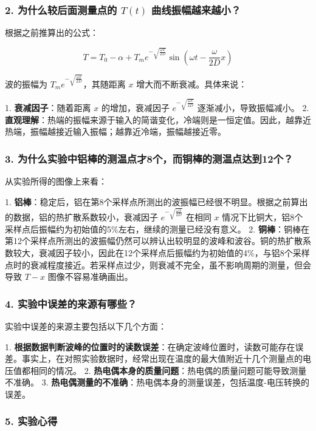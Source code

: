 \documentclass[zihao=5, UTF8]{article}
\theoremstyle{MyLineTheoremStyle} %
\theoremstyle{MyBlockTheoremStyle} %
\theoremstyle{MySubsubsectionStyle} %
\begin{document}
\subsubsection*{2. 为什么较后面测量点的 $ T(t) $ 曲线振幅越来越小？}

根据之前推算出的公式：

$$
T = T_0 - \alpha + T_m e^{-\sqrt{\frac{\omega x}{2D}}} \sin(\omega t - \frac{\omega}{2D} x)
$$

波的振幅为 $ T_m e^{-\sqrt{\frac{\omega x}{2D}}} $，其随距离 $ x $ 增大而不断衰减。具体来说：

1. \textbf{衰减因子}：随着距离 $ x $ 的增加，衰减因子 $ e^{-\sqrt{\frac{\omega x}{2D}}} $ 逐渐减小，导致振幅减小。
2. \textbf{直观理解}：热端的振幅来源于输入的简谐变化，冷端则是一恒定值。因此，越靠近热端，振幅越接近输入振幅；越靠近冷端，振幅越接近零。

\subsubsection*{3. 为什么实验中铝棒的测温点才8个，而铜棒的测温点达到12个？}

从实验所得的图像上来看：

1. \textbf{铝棒}：稳定后，铝在第8个采样点所测出的波振幅已经很不明显。根据之前算出的数据，铝的热扩散系数较小，衰减因子 $ e^{-\sqrt{\frac{\omega x}{2D}}} $ 在相同 $ x $ 情况下比铜大，铝8个采样点后振幅约为初始值的5\%左右，继续的测量已经没有意义。
2. \textbf{铜棒}：铜棒在第12个采样点所测出的波振幅仍然可以辨认出较明显的波峰和波谷。铜的热扩散系数较大，衰减因子较小，因此在12个采样点后振幅约为初始值的4\%，与铝8个采样点时的衰减程度接近。若采样点过少，则衰减不完全，虽不影响周期的测量，但会导致 $ T-x $ 图像不容易准确画出。

\subsubsection*{4. 实验中误差的来源有哪些？}

实验中误差的来源主要包括以下几个方面：

1. \textbf{根据数据判断波峰的位置时的读数误差}：在确定波峰位置时，读数可能存在误差。事实上，在对照实验数据时，经常出现在温度的最大值附近十几个测量点的电压值都相同的情况。
2. \textbf{热电偶本身的质量问题}：热电偶的质量问题可能导致测量不准确。
3. \textbf{热电偶测量的不准确}：热电偶本身的测量误差，包括温度-电压转换的误差。

\subsubsection*{5. 实验心得}
\end{document}
